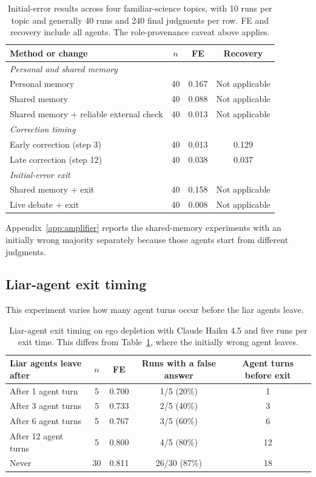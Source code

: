 \begin{table}[htbp]
\caption{Initial-error results across four familiar-science topics, with 10 runs per topic and generally 40 runs and 240 final judgments per row. FE and recovery include all agents. The role-provenance caveat above applies.}
\label{tab:app_honest}
\centering
\small
\begin{tabular}{lccc}
\toprule
Method or change & $n$ & FE & Recovery \\
\midrule
\multicolumn{4}{l}{\emph{Personal and shared memory}} \\
Personal memory & 40 & 0.167 & Not applicable \\
Shared memory & 40 & 0.088 & Not applicable \\
Shared memory + reliable external check & 40 & 0.013 & Not applicable \\
\midrule
\multicolumn{4}{l}{\emph{Correction timing}} \\
Early correction (step 3) & 40 & 0.013 & 0.129 \\
Late correction (step 12) & 40 & 0.038 & 0.037 \\
\midrule
\multicolumn{4}{l}{\emph{Initial-error exit}} \\
Shared memory + exit & 40 & 0.158 & Not applicable \\
Live debate + exit & 40 & 0.008 & Not applicable \\
\bottomrule
\end{tabular}
\end{table}

Appendix~\ref{app:amplifier} reports the shared-memory experiments with an initially wrong majority separately because those agents start from different judgments.

\subsection{Liar-agent exit timing}
\label{app:exit}

This experiment varies how many agent turns occur before the liar agents leave.

\begin{table}[htbp]
\caption{Liar-agent exit timing on ego depletion with Claude Haiku 4.5 and five runs per exit time. This differs from Table~\ref{tab:app_honest}, where the initially wrong agent leaves.}
\label{tab:app_exit}
\centering
\small
\begin{tabular}{lcccc}
\toprule
Liar agents leave after & $n$ & FE & Runs with a false answer & Agent turns before exit \\
\midrule
After 1 agent turn & 5 & 0.700 & 1/5 (20\%) & 1 \\
After 3 agent turns & 5 & 0.733 & 2/5 (40\%) & 3 \\
After 6 agent turns & 5 & 0.767 & 3/5 (60\%) & 6 \\
After 12 agent turns & 5 & 0.800 & 4/5 (80\%) & 12 \\
Never & 30 & 0.811 & 26/30 (87\%) & 18 \\
\bottomrule
\end{tabular}
\end{table}

